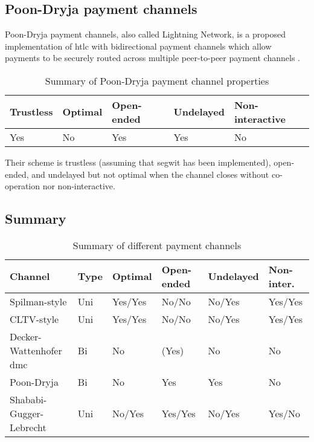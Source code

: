 \subsection{Poon-Dryja payment channels}

Poon-Dryja payment channels, also called Lightning Network, is a proposed
implementation of \gls{htlc} with bidirectional payment channels which allow
payments to be securely routed across multiple peer-to-peer payment channels
\cite{poon2016bitcoin}.

\begin{table}[h]
  \begin{tabularx}{\textwidth}{ | X | l | l | l | X |}
  \hline
  Trustless & Optimal & Open-ended & Undelayed & Non-interactive \\ \hline \hline
  Yes & No & Yes & Yes & No \\
  \hline
  \end{tabularx}
  \caption{Summary of Poon-Dryja payment channel properties}
  \label{fig:summaryPoonDryjaPaymentChannel}
\end{table}

Their scheme is trustless (assuming that \gls{segwit} has been implemented),
open-ended, and undelayed but not optimal when the channel closes without
co-operation nor non-interactive.

\subsection{Summary}

\begin{table}[h]
  \begin{tabularx}{\textwidth}{ | X | l | l | l | l | l |}
  \hline
  Channel & Type & Optimal & Open-ended & Undelayed & Non-inter. \\ \hline \hline
  Spilman-style & Uni & Yes/Yes & No/No & No/Yes & Yes/Yes \\ \hline
  CLTV-style & Uni & Yes/Yes & No/No & No/Yes & Yes/Yes \\ \hline
  Decker-Wattenhofer \gls{dmc} & Bi & No & (Yes) & No & No \\ \hline
  Poon-Dryja & Bi & No & Yes & Yes & No \\ \hline
  Shababi-Gugger-Lebrecht & Uni & No/Yes & Yes/Yes & No/Yes & Yes/No \\
  \hline
  \end{tabularx}
  \caption{Summary of different payment channels}
  \label{fig:summaryPaymentChannel}
\end{table}

